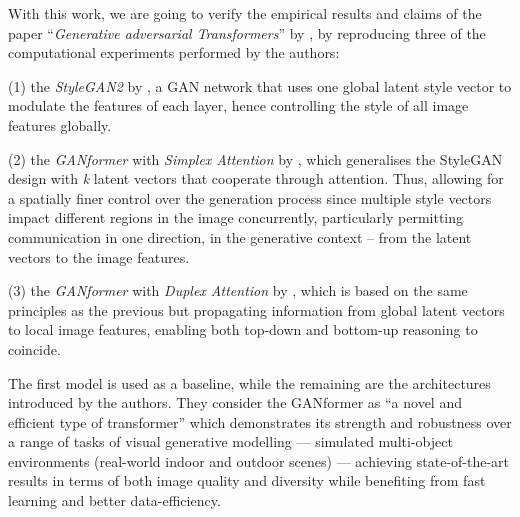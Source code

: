\documentclass{article}
\begin{document}
With this work, we are going to verify the empirical results and claims of the paper 
``\emph{Generative adversarial Transformers}'' by \citet{hudson2021generative}, by reproducing 
three of the computational experiments performed by the authors:
\begin{enumerate*}
	\item[(1)] the \textit{StyleGAN2} by \citet{karras2020analyzing,karras2019style}, a GAN 
	network that uses one global latent style vector to modulate the features of each layer, hence 
	controlling the style of all image features globally.
	\item[(2)] the \textit{GANformer} with \textit{Simplex Attention} by 
	\citet{hudson2021generative}, which generalises the StyleGAN design with \textit{k} latent 
	vectors that cooperate through attention. Thus, allowing for a spatially finer control over the 
	generation 
	process since multiple style vectors impact different regions in the image concurrently, 
	particularly 
	permitting communication in one direction, in the generative context – from the latent vectors to 
	the 
	image features.
	\item[(3)] the \textit{GANformer} with \textit{Duplex Attention} by \citet{hudson2021generative}, 
	which is based on the same principles as the previous but propagating information from 
	global latent vectors to local image features, enabling both top-down and bottom-up reasoning to 
	coincide.
\end{enumerate*} 

The first model is used as a baseline, while the remaining are the architectures introduced by the 
authors. 
They consider the GANformer as “a novel and efficient type of transformer” which demonstrates its 
strength 
and robustness over a range of tasks of visual generative modelling — simulated multi-object 
environments 
(real-world indoor and outdoor scenes) — achieving state-of-the-art results in terms of both image 
quality 
and diversity while benefiting from fast learning and better data-efficiency.
\end{document}

